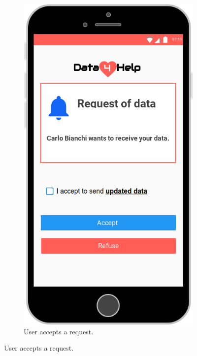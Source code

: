 \begin{figure}[ht]
  \centering
  \begin{subfigure}[t]{0.38\linewidth}
    \addtocounter{subfigure}{4}
    \includegraphics[width=\linewidth]{images/Mock-up/Acceptdecline_request.png}
    \caption{User accepts a request.}
  \end{subfigure} \hfil \hfil \hfil

\end{figure}

